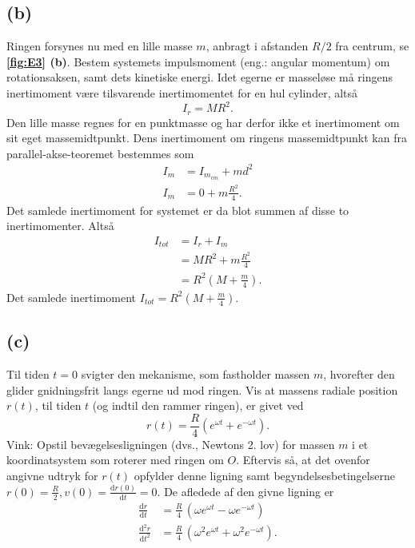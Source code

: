 \documentclass[12pt]{article}
\theoremstyle{definition}
\begin{document}
\subsection*{(b)}
Ringen forsynes nu med en lille masse $m$, anbragt i afstanden $R / 2$ fra centrum, se \textbf{\autoref{fig:E3} (b)}. Bestem systemets impulsmoment (eng.: angular momentum) om rotationsaksen, samt dets kinetiske energi.
\bigbreak
Idet egerne er masseløse må ringens inertimoment være tilsvarende inertimomentet for en hul cylinder, altså
\[ 
I_{r} = MR^2
.\]
Den lille masse regnes for en punktmasse og har derfor ikke et inertimoment om sit eget massemidtpunkt. Dens inertimoment om ringens massemidtpunkt kan fra parallel-akse-teoremet bestemmes som
\begin{align*}
  I_{m} &= I_{m_{cm}} + md^2 \\
  I_{m} &= 0 + m \frac{R^2}{4}
.\end{align*}
Det samlede inertimoment for systemet er da blot summen af disse to inertimomenter. Altså
\begin{align*}
  I_{tot} &= I_r + I_m \\
  &= MR^2 + m\frac{R^2}{4} \\
  &= R^2 \left( M + \frac{m}{4} \right)
.\end{align*}
Det samlede inertimoment \underline{\underline{$I_{tot} = R^2 \left( M + \frac{m}{4} \right)$}}.

\subsection*{(c)}
Til tiden $t = 0$ svigter den mekanisme, som fastholder massen $m$, hvorefter den glider gnidningsfrit langs egerne ud mod ringen. Vis at massens radiale position $r(t)$, til tiden $t$ (og indtil den rammer ringen), er givet ved
\[ 
r(t) = \frac{R}{4}\left( e^{\omega t} + e^{- \omega t} \right)
.\]
Vink: Opstil bevægelsesligningen (dvs., Newtons 2. lov) for massen $m$ i et koordinatsystem som roterer med ringen om $O$. Eftervis så, at det ovenfor angivne udtryk for $r(t)$ opfylder denne ligning samt begyndelsesbetingelserne $r(0) = \frac{R}{2}, v(0) = \frac{\mathrm{d}r(0)}{\mathrm{d}t} = 0$.
\bigbreak
De afledede af den givne ligning er
\begin{align*}
  \frac{\mathrm{d}r}{\mathrm{d}t} &=\frac{R}{4} \, {\left(\omega e^{\omega t} - \omega e^{-\omega t}\right)}\\
  \frac{\mathrm{d}^2 r}{\mathrm{d}t^2} &= \frac{R}{4} \, {\left(\omega^{2} e^{\omega t} + \omega^{2} e^{-\omega t}\right)}
.\end{align*}
\end{document}
